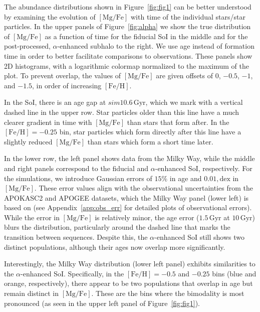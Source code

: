 \documentclass[twocolumn]{aastex631}
\newcommand{\Gyr}{\ensuremath{\textrm{Gyr}}}
\newcommand{\FeH}{\ensuremath{[\textrm{Fe}/\textrm{H}]}}
\newcommand{\MgFe}{\ensuremath{[\textrm{Mg}/\textrm{Fe}]}}
\newcommand{\dex}{\ensuremath{\textrm{dex}}}
\begin{document}
The abundance distributions shown in Figure~\ref{fig:fig1} can be better understood by examining the evolution of \MgFe{} with time of the individual stars/star particles. In the upper panels of Figure~\ref{fig:alpha} we show the true distribution of \MgFe{} as a function of time for the fiducial SoI in the middle and for the post-processed, $\alpha$-enhanced subhalo to the right. We use age instead of formation time in order to better facilitate comparisons to observations. These panels show 2D histograms, with a logarithmic colormap normalized to the maximum of the plot. To prevent overlap, the values of \MgFe{} are given offsets of $0$, $-0.5$, $-1$, and $-1.5$, in order of increasing \FeH{}.

In the SoI, there is an age gap at $sim10.6\,\Gyr$, which we mark with a vertical dashed line in the upper row. Star particles older than this line have a much clearer gradient in time with \MgFe{} than stars that form after. In the $\FeH=-0.25$ bin, star particles which form directly after this line have a slightly reduced \MgFe{} than stars which form a short time later.

In the lower row, the left panel shows data from the Milky Way, while the middle and right panels correspond to the fiducial and $\alpha$-enhanced SoI, respectively. For the simulations, we introduce Gaussian errors of $15\%$ in age and $0.01,\dex$ in \MgFe{}. These error values align with the observational uncertainties from the APOKASC2 and APOGEE datasets, which the Milky Way panel (lower left) is based on (see Appendix~\ref{app:obs_err} for detailed plots of observational errors). While the error in \MgFe{} is relatively minor, the age error ($1.5\,\Gyr$ at $10\,\Gyr$) blurs the distribution, particularly around the dashed line that marks the transition between sequences. Despite this, the $\alpha$-enhanced SoI still shows two distinct populations, although their ages now overlap more significantly.

Interestingly, the Milky Way distribution (lower left panel) exhibits similarities to the $\alpha$-enhanced SoI. Specifically, in the $\FeH=-0.5$ and $-0.25$ bins (blue and orange, respectively), there appear to be two populations that overlap in age but remain distinct in \MgFe{}. These are the bins where the bimodality is most pronounced (as seen in the upper left panel of Figure~\ref{fig:fig1}).
\end{document}
